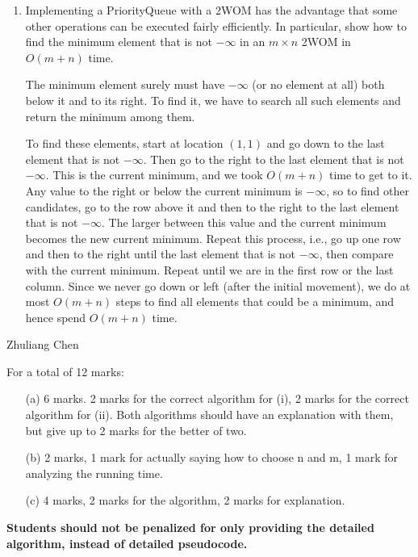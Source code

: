 \begin{enumerate}

\item
Implementing a PriorityQueue with a 2WOM has the advantage that some
other operations can be executed fairly efficiently.  In particular,
show how to find the minimum element that is not $-\infty$
    in an $m\times n$ 2WOM in $O(m+n)$ time.

\begin{solution}
The minimum element surely must have $-\infty$ (or no element at all) both
below it and to its right.  To find it, we have to search all such elements
and return the minimum among them.  

To find these elements, start at location $(1,1)$ and go down to the last 
element that is not
$-\infty$.  Then go to the right to the last element that is not
$-\infty$.  This is the current minimum, and we took $O(m+n)$ time to
get to it.  Any value to the right or below the current minimum is $-\infty$, 
so to find other candidates, go to the row
above it and then to the right to the last element that is not $-\infty$.
The larger between this value and the current minimum becomes the new
current minimum.  Repeat this process, i.e., go up one row and then to the
right until the last element that is not $-\infty$, then compare with
the current minimum.  Repeat until we are in the first row or the last
column.  Since we never go down or left (after the initial
movement), we do at most $O(m+n)$ steps to find all elements that could be
a minimum, and hence spend $O(m+n)$ time.
\end{solution}



\end{enumerate}


\begin{suggestedMarkingScheme}
\begin{authorship}
Zhuliang Chen
\end{authorship}
For a total of 12 marks:
\begin{itemize}
  \item[(a)] 6 marks. 2 marks for the correct algorithm for (i), 2 marks for
       the correct algorithm for (ii). Both algorithms should have
       an explanation with them, but give up to 2 marks for the better
       of two.
  \item[(b)] 2 marks, 1 mark for actually saying how to choose n and m, 1
       mark for analyzing the running time.
  \item[(c)] 4 marks, 2 marks for the algorithm, 2 marks for explanation.
\end{itemize}
\textbf{ Students should not be penalized for only providing the
detailed algorithm, instead of detailed pseudocode.}
\end{suggestedMarkingScheme}
